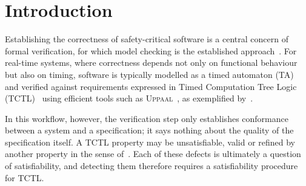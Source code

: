 \section{Introduction}\label{sec:intro}






Establishing the correctness of safety-critical software is a central concern of formal verification, for which model checking is the established approach~\cite{Baier08,Clarke99}. For real-time systems, where correctness depends not only on functional behaviour but also on timing, software is typically modelled as a timed automaton (TA)~\cite{AlurDill1994} and verified against requirements expressed in Timed Computation Tree Logic (TCTL)~\cite{AlurCourcoubetisDill1990} using efficient tools such as \textsc{Uppaal}~\cite{BehrmannLarsenYi2004Uppaal}, as exemplified by~\cite{Guo2014UPPAAL,Laursen2020Railway,Mikucionis2010Herschel}. 


In this workflow, however, the verification step only establishes conformance between a system and a specification; it says nothing about the quality of the specification itself. A TCTL property may be unsatisfiable, valid or refined by another property in the sense of~\cite{10.1145/3808127,BrodoScaloraHenkler2026MinimalTemporalProperties}. Each of these defects is ultimately a question of satisfiability, and detecting them therefore requires a satisfiability procedure for TCTL. 


